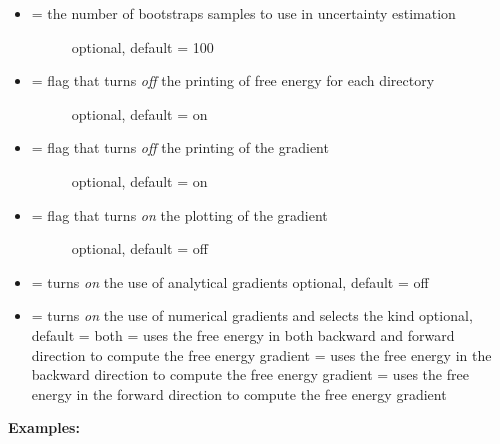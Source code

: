 \documentclass[letterpaper,10pt,english]{manual}
\begin{document}
\begin{itemize}
\begin{description}
\end{description}

\item {} \begin{description}
\item[{ = the number of bootstraps samples to use in uncertainty estimation}] \leavevmode
optional, default = 100

\end{description}

\item {} \begin{description}
\item[{  = flag that turns \emph{off} the printing of free energy for each directory}] \leavevmode
optional, default = on

\end{description}

\item {} \begin{description}
\item[{  = flag that turns \emph{off} the printing of the gradient}] \leavevmode
optional, default = on

\end{description}

\item {} \begin{description}
\item[{  = flag that turns \emph{on} the plotting of the gradient}] \leavevmode
optional, default = off

\end{description}

\item {} 
 = turns \emph{on} the use of analytical gradients
optional, default = off

\item {} 
 = turns \emph{on} the use of numerical gradients and selects the kind
optional, default = both
 = uses the free energy in both backward and forward direction to compute the free energy gradient
 = uses the free energy in the backward direction to compute the free energy gradient
 = uses the free energy in the forward direction to compute the free energy gradient

\end{itemize}

\textbf{Examples:}
\end{document}
